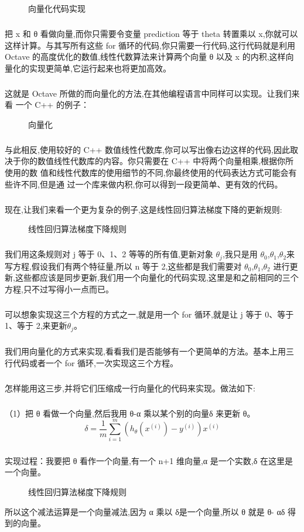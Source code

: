 \documentclass{article}
\begin{document}
\begin{CJK}{UTF8}{gbsn}
\begin{figure}[H]
\caption{向量化代码实现}
\label{fig:127}
\end{figure}
\subparagraph{}
把 x 和 θ 看做向量,而你只需要令变量 prediction 等于 theta 转置乘以 x,你就可以这样计算。与其写所有这些 for 循环的代码,你只需要一行代码,这行代码就是利用Octave 的高度优化的数值,线性代数算法来计算两个向量 θ 以及 x 的内积,这样向量化的实现更简单,它运行起来也将更加高效。
\subparagraph{}
这就是 Octave 所做的而向量化的方法,在其他编程语言中同样可以实现。让我们来看
一个 C++ 的例子：
\begin{figure}[H]
\caption{向量化}
\label{fig:128}
\end{figure}
\subparagraph{}
与此相反,使用较好的 C++ 数值线性代数库,你可以写出像右边这样的代码,因此取
决于你的数值线性代数库的内容。你只需要在 C++ 中将两个向量相乘,根据你所使用的数
值和线性代数库的使用细节的不同,你最终使用的代码表达方式可能会有些许不同,但是通
过一个库来做内积,你可以得到一段更简单、更有效的代码。
\subparagraph{}
现在,让我们来看一个更为复杂的例子,这是线性回归算法梯度下降的更新规则:
\begin{figure}[H]
\caption{线性回归算法梯度下降规则}
\label{fig:129}
\end{figure}
\subparagraph{}
我们用这条规则对 j 等于 0、1、2 等等的所有值,更新对象 $\theta_j$,我只是用 $\theta_0$,$\theta_1$,$\theta_2$来写方程,假设我们有两个特征量,所以 n 等于 2,这些都是我们需要对 $\theta_0$,$\theta_1$,$\theta_2$ 进行更新,这些都应该是同步更新,我们用一个向量化的代码实现,这里是和之前相同的三个方程,只不过写得小一点而已。
\subparagraph{}
可以想象实现这三个方程的方式之一,就是用一个 for 循环,就是让 j 等于 0、等于
1、等于 2,来更新$\theta_j$。
\subparagraph{}
我们用向量化的方式来实现,看看我们是否能够有一个更简单的方法。基本上用三行代码或者一个 for 循环,一次实现这三个方程。
\subparagraph{}
怎样能用这三步,并将它们压缩成一行向量化的代码来实现。做法如下:
\subparagraph{}
（1）把 θ 看做一个向量,然后我用 θ-α 乘以某个别的向量δ 来更新 θ。
\begin{equation}
\delta=\frac{1}{m}\sum_{i=1}^m(h_\theta(x^{(i)})-y^{(i)})x^{(i)}
\end{equation}
\subparagraph{}
实现过程：我要把 θ 看作一个向量,有一个 n+1 维向量,α 是一个实数,δ 在这里是一个向量。
\begin{figure}[H]
\caption{线性回归算法梯度下降规则}
\label{fig:130}
\end{figure}
所以这个减法运算是一个向量减法,因为 α 乘以 δ是一个向量,所以 θ 就是 θ- αδ
得到的向量。

\end{CJK}
\end{document}
